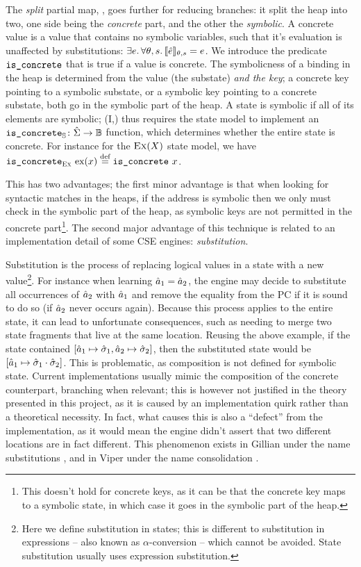 The \emph{split} partial map, \SplitPMap, goes further for reducing branches: it split the heap into two, one side being the \emph{concrete} part, and the other the \emph{symbolic}. A concrete value is a value that contains no symbolic variables, such that it's evaluation is unaffected by substitutions: $\exists e\ldotp \forall \theta,s\ldotp \llbracket\hat{e}\rrbracket_{\theta,s}=e$. We introduce the predicate $\texttt{is\_concrete}$ that is true if a value is concrete. The symbolicness of a binding in the heap is determined from the value (the substate) \emph{and the key}; a concrete key pointing to a symbolic substate, or a symbolic key pointing to a concrete substate, both go in the symbolic part of the heap. A state is symbolic if all of its elements are symbolic; \SplitPMap(I,\mmdl) thus requires the state model to implement an $\texttt{is\_concrete}_{\mathbb S}\colon \hat{\Sigma} \rightarrow \mathbb{B}$ function, which determines whether the entire state is concrete. For instance for the $\textsc{Ex}(X)$ state model, we have ${\texttt{is\_concrete}_{\textsc{Ex}}~\text{ex}(x)\stackrel{\textnormal{def}}= \texttt{is\_concrete}~x}$.

This has two advantages; the first minor advantage is that when looking for syntactic matches in the heaps, if the address is symbolic then we only must check in the symbolic part of the heap, as symbolic keys are not permitted in the concrete part\footnote{This doesn't hold for concrete keys, as it can be that the concrete key maps to a symbolic state, in which case it goes in the symbolic part of the heap.}. The second major advantage of this technique is related to an implementation detail of some CSE engines: \emph{substitution}. 

Substitution is the process of replacing logical values in a state with a new value\footnote{Here we define substitution in states; this is different to substitution in expressions -- also known as $\alpha$-conversion -- which cannot be avoided. State substitution usually uses expression substitution.}. For instance when learning $\hat{a}_1 = \hat{a}_2$, the engine may decide to substitute all occurrences of $\hat{a}_2$ with $\hat{a}_1$ and remove the equality from the PC if it is sound to do so (if $\hat{a}_2$ never occurs again). Because this process applies to the entire state, it can lead to unfortunate consequences, such as needing to merge two state fragments that live at the same location. Reusing the above example, if the state contained $[\hat{a}_1 \mapsto \hat{\sigma}_1, \hat{a}_2\mapsto \hat{\sigma}_2]$, then the substituted state would be $[\hat{a}_1 \mapsto \hat{\sigma}_1 \cdot \hat{\sigma}_2]$. This is problematic, as composition is not defined for symbolic state. Current implementations usually mimic the composition of the concrete counterpart, branching when relevant; this is however not justified in the theory presented in this project, as it is caused by an implementation quirk rather than a theoretical necessity. In fact, what causes this is also a ``defect'' from the implementation, as it would mean the engine didn't assert that two different locations are in fact different. This phenomenon exists in Gillian under the name substitutions \cite{gillian2}, and in Viper under the name consolidation \cite{viper-consolidation}.

